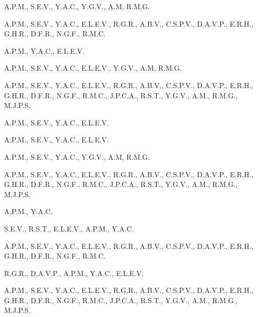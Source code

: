 \documentclass[10pt,twoside]{rcmart} %
\begin{document}
	\begin{description}\setlength{\parskip}{0pt}
		\item[Conceptualización] A.P.M., S.E.V., Y.A.C., Y.G.V., A.M, R.M.G.
		
		\item[Curación de datos] A.P.M., S.E.V., Y.A.C., E.L.E.V., R.G.R., A.B.V., C.S.P.V., D.A.V.P., E.R.H., G.H.R., D.F.R., N.G.F., R.M.C.
		
		\item[Análisis formal] A.P.M., Y.A.C., E.L.E.V.
		
		\item[Adquisición de Financiamiento] A.P.M., S.E.V., Y.A.C., E.L.E.V., Y.G.V., A.M, R.M.G.
		
		\item[Investigación] A.P.M., S.E.V., Y.A.C., E.L.E.V., R.G.R., A.B.V., C.S.P.V., D.A.V.P., E.R.H., G.H.R., D.F.R., N.G.F., R.M.C., J.P.C.A., R.S.T., Y.G.V., A.M., R.M.G., M.J.P.S.
		
		\item[Metodología] A.P.M., S.E.V., Y.A.C., E.L.E.V.
		
		\item[Administración de proyecto] A.P.M., S.E.V., Y.A.C., E.L.E.V.
		
		\item[Recursos] A.P.M., S.E.V., Y.A.C., Y.G.V., A.M, R.M.G.
		
		\item[Software] A.P.M., S.E.V., Y.A.C., E.L.E.V., R.G.R., A.B.V., C.S.P.V., D.A.V.P., E.R.H., G.H.R., D.F.R., N.G.F., R.M.C., J.P.C.A., R.S.T., Y.G.V., A.M., R.M.G., M.J.P.S.
		
		\item[Supervisión] A.P.M., Y.A.C.
		
		\item[Validación] S.E.V., R.S.T., E.L.E.V., A.P.M., Y.A.C.
		
		\item[Visualización] A.P.M., S.E.V., Y.A.C., E.L.E.V., R.G.R., A.B.V., C.S.P.V., D.A.V.P., E.R.H., G.H.R., D.F.R., N.G.F., R.M.C.
		
		\item[Redacción: preparación del borrador original] R.G.R., D.A.V.P., A.P.M., Y.A.C., E.L.E.V.
		
		\item[Redacción: revisión y edición] A.P.M., S.E.V., Y.A.C., E.L.E.V., R.G.R., A.B.V., C.S.P.V., D.A.V.P., E.R.H., G.H.R., D.F.R., N.G.F., R.M.C., J.P.C.A., R.S.T., Y.G.V., A.M., R.M.G., M.J.P.S.
	\end{description}
\end{document}
